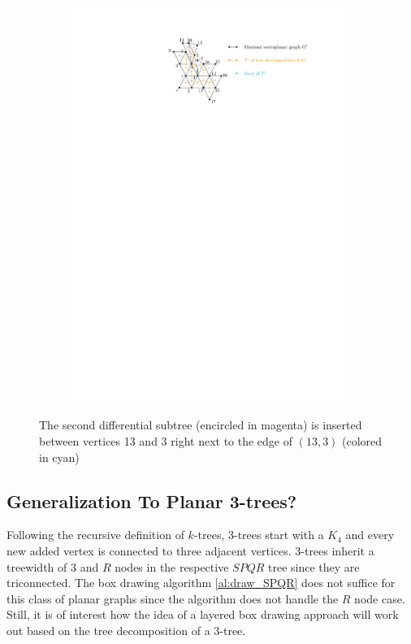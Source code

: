 \begin{figure}[H]
	\centering
	\begin{subfigure}{\textwidth}
		\centering
		\includegraphics[page=13,width=0.9\linewidth]{graphics/maximal_outerplanar_example_drawings.pdf}
	\end{subfigure}
	\caption{The second differential subtree (encircled in magenta) is inserted between vertices 13 and 3 right next to the edge of $(13,3)$ (colored in cyan)}
\end{figure}

\subsection{Generalization To Planar 3-trees?}
Following the recursive definition of $k$-trees, 3-trees start with a $K_4$ and every new added vertex is connected to three adjacent vertices. 3-trees inherit a treewidth of 3 and $R$ nodes in the respective $SPQR$ tree since they are triconnected. The box drawing algorithm \ref{al:draw_SPQR} does not suffice for this class of planar graphs since the algorithm does not handle the $R$ node case. Still, it is of interest how the idea of a layered box drawing approach will work out based on the tree decomposition of a 3-tree.

